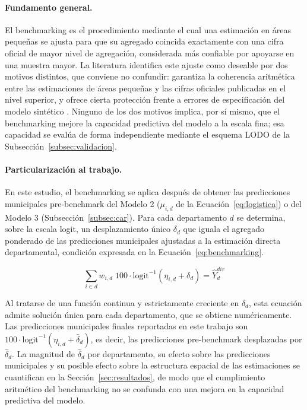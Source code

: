 \paragraph{Fundamento general.}
El benchmarking es el procedimiento mediante el cual una estimación en áreas pequeñas se ajusta para que su agregado coincida exactamente con una cifra oficial de mayor nivel de agregación, considerada más confiable por apoyarse en una muestra mayor. La literatura identifica este ajuste como deseable por dos motivos distintos, que conviene no confundir: garantiza la coherencia aritmética entre las estimaciones de áreas pequeñas y las cifras oficiales publicadas en el nivel superior, y ofrece cierta protección frente a errores de especificación del modelo sintético \cite{DattaGhoshSteortsMaples_2011}. Ninguno de los dos motivos implica, por sí mismo, que el benchmarking mejore la capacidad predictiva del modelo a la escala fina; esa capacidad se evalúa de forma independiente mediante el esquema LODO de la Subsección~\ref{subsec:validacion}.

\paragraph{Particularización al trabajo.}
En este estudio, el benchmarking se aplica después de obtener las predicciones municipales pre-benchmark del Modelo 2 ($\mu_{i,d}$ de la Ecuación~\ref{eq:logistica}) o del Modelo 3 (Subsección~\ref{subsec:car}). Para cada departamento $d$ se determina, sobre la escala logit, un desplazamiento único $\delta_d$ que iguala el agregado ponderado de las predicciones municipales ajustadas a la estimación directa departamental, condición expresada en la Ecuación~\ref{eq:benchmarking}.

\begin{equation}
    \sum_{i \in d} w_{i,d}\; 100 \cdot \text{logit}^{-1}(\eta_{i,d} + \delta_d) = \hat{Y}_d^{dir}
    \label{eq:benchmarking}
\end{equation}

Al tratarse de una función continua y estrictamente creciente en $\delta_d$, esta ecuación admite solución única para cada departamento, que se obtiene numéricamente. Las predicciones municipales finales reportadas en este trabajo son $100\cdot\text{logit}^{-1}(\eta_{i,d}+\hat\delta_d)$, es decir, las predicciones pre-benchmark desplazadas por $\hat\delta_d$. La magnitud de $\hat\delta_d$ por departamento, su efecto sobre las predicciones municipales y su posible efecto sobre la estructura espacial de las estimaciones se cuantifican en la Sección~\ref{sec:resultados}, de modo que el cumplimiento aritmético del benchmarking no se confunda con una mejora en la capacidad predictiva del modelo.

